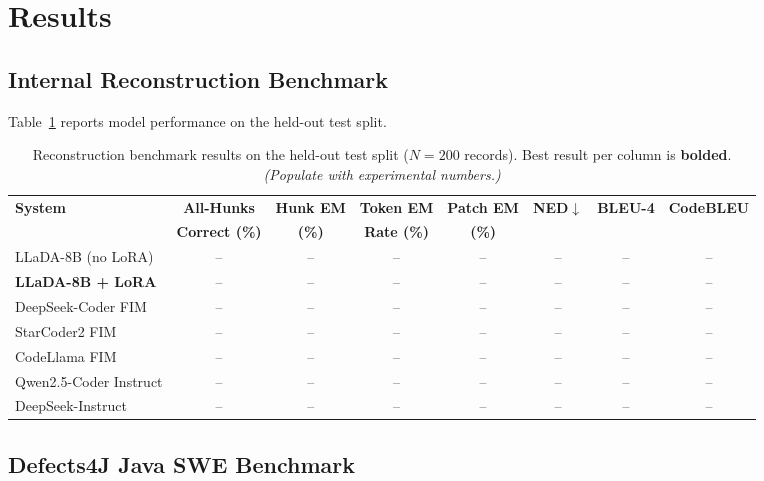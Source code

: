\documentclass[11pt,a4paper]{article}
\begin{document}
\section{Results}
\label{sec:results}

\subsection{Internal Reconstruction Benchmark}

Table~\ref{tab:reconstruction} reports model performance on the held-out test split.

\begin{table}[H]
\centering
\caption{Reconstruction benchmark results on the held-out test split (\(N = 200\) records). Best result per column is \textbf{bolded}. \textit{(Populate with experimental numbers.)}}
\label{tab:reconstruction}
\renewcommand{\arraystretch}{1.2}
\begin{tabular}{lccccccc}
\toprule
\textbf{System} & \textbf{All-Hunks} & \textbf{Hunk EM} & \textbf{Token EM} & \textbf{Patch EM} & \textbf{NED}$\downarrow$ & \textbf{BLEU-4} & \textbf{CodeBLEU} \\
 & \textbf{Correct (\%)} & \textbf{(\%)} & \textbf{Rate (\%)} & \textbf{(\%)} & & & \\
\midrule
LLaDA-8B (no LoRA)        & -- & -- & -- & -- & -- & -- & -- \\
\textbf{LLaDA-8B + LoRA}  & -- & -- & -- & -- & -- & -- & -- \\
\midrule
DeepSeek-Coder FIM        & -- & -- & -- & -- & -- & -- & -- \\
StarCoder2 FIM            & -- & -- & -- & -- & -- & -- & -- \\
CodeLlama FIM             & -- & -- & -- & -- & -- & -- & -- \\
\midrule
Qwen2.5-Coder Instruct    & -- & -- & -- & -- & -- & -- & -- \\
DeepSeek-Instruct         & -- & -- & -- & -- & -- & -- & -- \\
\bottomrule
\end{tabular}
\end{table}

\subsection{Defects4J Java SWE Benchmark}
\end{document}
